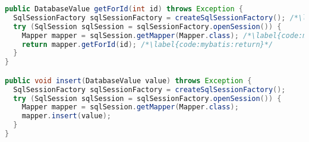 
\begin{lstlisting}[language=Java, caption={Example of query and insert operations using \citet{MyBatis}}, label={code:mybatis}]
public DatabaseValue getForId(int id) throws Exception {
  SqlSessionFactory sqlSessionFactory = createSqlSessionFactory(); /*\label{code:mybatis:sqlSessionFactory}*/
  try (SqlSession sqlSession = sqlSessionFactory.openSession()) {
    Mapper mapper = sqlSession.getMapper(Mapper.class); /*\label{code:mybatis:getMapper}*/
    return mapper.getForId(id); /*\label{code:mybatis:return}*/
  }
}

public void insert(DatabaseValue value) throws Exception {
  SqlSessionFactory sqlSessionFactory = createSqlSessionFactory();
  try (SqlSession sqlSession = sqlSessionFactory.openSession()) {
    Mapper mapper = sqlSession.getMapper(Mapper.class);
    mapper.insert(value);
  }
}
\end{lstlisting}
